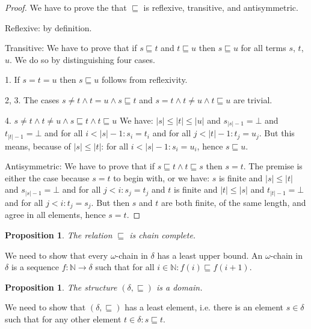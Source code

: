 \documentclass[a4paper]{article}
\newcommand{\arr}{\rightarrow}
\newtheorem{thmPONuFisChainComplete}[defNuF]{Proposition}
\newtheorem{thmPONuFisADomain}[defNuF]{Proposition}
\begin{document}
\begin{proof}

We have to prove the that $\sqsubseteq$ is reflexive, transitive, and
antisymmetric.

Reflexive: by definition.

Transitive: We have to prove that if $s \sqsubseteq t$ and $t \sqsubseteq u$
then $s \sqsubseteq u$ for all terms $s$, $t$, $u$. We do so by distinguishing
four cases.

1. If $s = t = u$ then $s \sqsubseteq u$ follows from reflexivity.

2, 3. The cases $s \neq t \wedge t = u \wedge s \sqsubseteq t$ and $s = t
\wedge t \neq u \wedge t \sqsubseteq u$ are trivial.

4. $s \neq t \wedge t \neq u \wedge s \sqsubseteq t \wedge t \sqsubseteq u$ We
have: $|s| \leq |t| \leq |u|$ and $s_{|s|-1} = \bot$ and $t_{|t|-1} = \bot$ and
for all $i < |s|-1: s_i = t_i$ and for all $j < |t|-1: t_j = u_j$.  But this
means, because of $|s| \leq |t|$: for all $i < |s|-1: s_i = u_i$, hence $s
\sqsubseteq u$.

Antisymmetric: We have to prove that if $s \sqsubseteq t \wedge t \sqsubseteq
s$ then $s = t$.  The premise is either the case because $s = t$ to begin with,
or we have: $s$ is finite and $|s| \leq |t|$ and $s_{|s|-1} = \bot$ and for all $j <
i: s_j = t_j$ and $t$ is finite and $|t| \leq |s|$ and $t_{|t|-1} = \bot$ and for all
$j < i: t_j = s_j$.  But then $s$ and $t$ are both finite, of the same length,
and agree in all elements, hence $s = t$.

\end{proof}

\begin{thmPONuFisChainComplete}

The relation $\sqsubseteq$ is chain complete.

\end{thmPONuFisChainComplete}

We need to show that every $\omega$-chain in $\delta$ has a least upper bound.
An $\omega$-chain in $\delta$ is a sequence $f : \mathbb{N} \arr \delta$ such
that for all $i \in \mathbb{N}: f(i) \sqsubseteq f(i + 1)$.


\begin{thmPONuFisADomain}

The structure $(\delta, \sqsubseteq)$ is a domain.

\end{thmPONuFisADomain}

We need to show that $(\delta, \sqsubseteq)$ has a least element, i.e. there is
an element $s \in \delta$ such that for any other element $t \in \delta: s
\sqsubseteq t$.
\end{document}
